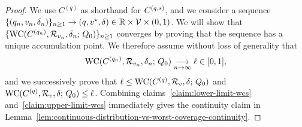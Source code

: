 \begin{proof}
  We use $C^{(q)}$ as shorthand for $C^{(q,s)}$, and we consider a
  sequence $\{ (q_n , v_n, \delta_n) \}_{n \ge 1} \to (q, v^\star, \delta) \in \mathbb{R}
  \times \mathcal{V} \times (0,1)$.  We will show that $\{ \textup{WC}(C^{(q_n)},
  \mathcal{R}_{v_n}, \delta_n; \, Q_0) \}_{n \ge 1}$ converges by proving that
  the sequence has a unique accumulation point.  We therefore assume without
  loss of generality that
  \begin{align}
    \label{eqn:limit-of-wcs}
    \textup{WC}(C^{(q_n)}, \mathcal{R}_{v_n}, \delta_n; \, Q_0)
    \underset{n \to \infty}{\longrightarrow} \ell \in [0,1],
  \end{align}
  and we successively prove that $\ell \le \textup{WC}(C^{(q)}, \mathcal{R}_{v}, \delta;
  \, Q_0)$ and $ \textup{WC}(C^{(q)}, \mathcal{R}_{v}, \delta; \, Q_0) \le \ell$.
  Combining claims~\ref{claim:lower-limit-wcs}
  and~\ref{claim:upper-limit-wcs} immediately gives the continuity claim in
  Lemma~\ref{lem:continuous-distribution-vs-worst-coverage-continuity}.


\end{proof}
